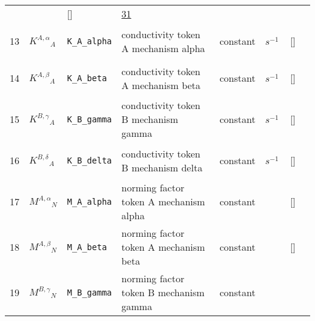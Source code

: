 \begin{longtable}{|p{1cm}|p{3cm}|p{3cm}|p{7cm}|p{3.0cm}|p{3cm}|p{2cm}|p{1cm}|}
             & $  $
             & []
             & \hyperlink{"e:31"}{ 31 }
                 \\
    13
             & \hypertarget{"v:13"}{ $ {{K^{A,\alpha}}}{_{A}} $}
             & \verb|K_A_alpha|
             & conductivity token A mechanism alpha 
             & \begin{lay}constant \end{lay}
             & $ s^{-1} \, $
             & []
             & \\
    14
             & \hypertarget{"v:14"}{ $ {{K^{A,\beta}}}{_{A}} $}
             & \verb|K_A_beta|
             & conductivity token A mechanism beta
             & \begin{lay}constant \end{lay}
             & $ s^{-1} \, $
             & []
             & \\
    15
             & \hypertarget{"v:15"}{ $ {{K^{B,\gamma}}}{_{A}} $}
             & \verb|K_B_gamma|
             & conductivity token B mechanism gamma
             & \begin{lay}constant \end{lay}
             & $ s^{-1} \, $
             & []
             & \\
    16
             & \hypertarget{"v:16"}{ $ {{K^{B,\delta}}}{_{A}} $}
             & \verb|K_B_delta|
             & conductivity token B mechanism delta
             & \begin{lay}constant \end{lay}
             & $ s^{-1} \, $
             & []
             & \\
    17
             & \hypertarget{"v:17"}{ $ {{M^{A,\alpha}}}{_{N}} $}
             & \verb|M_A_alpha|
             & norming factor token A mechanism alpha
             & \begin{lay}constant \end{lay}
             & $  $
             & []
             & \\
    18
             & \hypertarget{"v:18"}{ $ {{M^{A,\beta}}}{_{N}} $}
             & \verb|M_A_beta|
             & norming factor token A mechanism beta
             & \begin{lay}constant \end{lay}
             & $  $
             & []
             & \\
    19
             & \hypertarget{"v:19"}{ $ {{M^{B,\gamma}}}{_{N}} $}
             & \verb|M_B_gamma|
             & norming factor token B mechanism gamma
             & \begin{lay}constant \end{lay}

\end{longtable}
